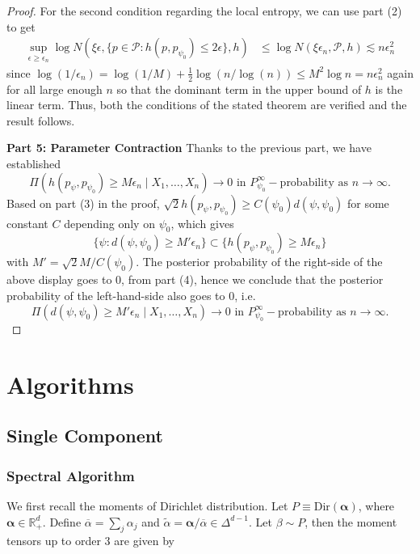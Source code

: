 \documentclass[bj,authoryear]{imsart}
\theoremstyle{plain}
\theoremstyle{remark}
\def\balpha{{\boldsymbol\alpha}}
\def\bbR{\mathbb{R}}
\def\cP{\mathcal{P}}
\begin{document}
\begin{appendix}
\begin{proof}
For the second condition regarding the local entropy, we can use part (2) to get
\begin{align*}
    \sup_{\epsilon\geq \epsilon_n} \log N\left(\xi\epsilon, \{p\in\cP: h(p,p_{\psi_0})\leq 2\epsilon\}, h\right)&\leq \log N(\xi\epsilon_n, \cP, h) \lesssim n\epsilon_n^2
\end{align*}
since $\log(1/\epsilon_n) = \log (1/M) + \frac{1}{2}\log(n/\log(n)) \leq M^2\log n =n\epsilon_n^2$ again for all large enough $n$ so that the dominant term in the upper bound of $h$ is the linear term. Thus, both the conditions of the stated theorem are verified and the result follows.

\vspace{1em}
\textbf{Part 5: Parameter Contraction} Thanks to the previous part, we have established
$$\Pi\left(h(p_{\psi}, p_{\psi_0})\geq M\epsilon_n \mid X_1,\dots,X_n\right)\to 0  \text{ in } P_{\psi_0}^{\infty}-\text{probability}\text{ as } n\to \infty.$$
Based on part (3) in the proof, $\sqrt{2}h(p_{\psi},p_{\psi_0}) \geq C(\psi_0) d(\psi,\psi_0)$ for some constant $C$ depending only on $\psi_0$, which gives
$$\{\psi: d(\psi,\psi_0)\geq M'\epsilon_n\} \subset \{h(p_{\psi},p_{\psi_0})\geq M\epsilon_n\}$$
with $M'=\sqrt{2}M / C(\psi_0)$. The posterior probability of the right-side of the above display goes to 0, from part (4), hence we conclude that the posterior probability of the left-hand-side also goes to 0, i.e.
$$\Pi\left(d(\psi,\psi_0)\geq M'\epsilon_n \mid X_1,\dots,X_n\right)\to 0  \text{ in } P_{\psi_0}^{\infty}-\text{probability}\text{ as } n\to \infty.$$
\end{proof}

\section{Algorithms}

\subsection{Single Component}
\subsubsection{Spectral Algorithm}
\label{app:spectral_algorithm}
We first recall the moments of Dirichlet distribution. Let $P\equiv\text{Dir}(\balpha)$, where $\balpha\in\bbR_+^d$. Define $\overline{\alpha}=\sum_j \alpha_j$ and $\tilde{\alpha}=\balpha / \overline{\alpha} \in\Delta^{d-1}$. Let $\beta\sim P$, then the moment tensors up to order 3 are given by


\end{appendix}
\end{document}
